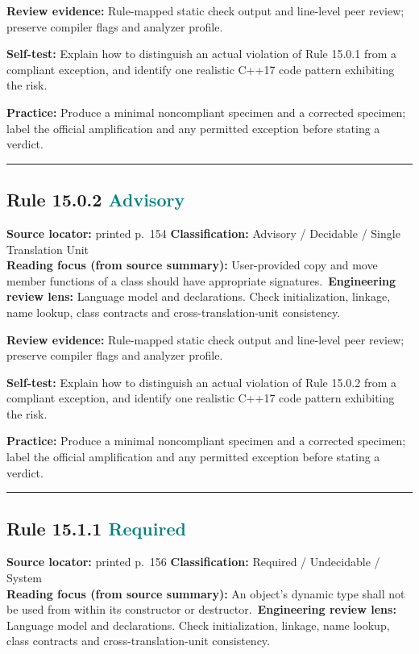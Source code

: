 \documentclass[10pt,letterpaper]{article}
\begin{document}
\textbf{Review evidence:} Rule-mapped static check output and line-level peer review; preserve compiler flags and analyzer profile.

\textbf{Self-test:} Explain how to distinguish an actual violation of Rule 15.0.1 from a compliant exception, and identify one realistic C++17 code pattern exhibiting the risk.\par
\textbf{Practice:} Produce a minimal noncompliant specimen and a corrected specimen; label the official amplification and any permitted exception before stating a verdict.
\smallskip\hrule\smallskip
\subsection*{Rule 15.0.2 \enspace \texorpdfstring{\small\textcolor{teal}{Advisory}}{Advisory}}
\noindent\textbf{Source locator:} printed p.~154 \quad\textbf{Classification:} Advisory / Decidable / Single Translation Unit\\
\textbf{Reading focus (from source summary):} User-provided copy and move member functions of a class should have appropriate signatures.\
\textbf{Engineering review lens:} Language model and declarations. Check initialization, linkage, name lookup, class contracts and cross-translation-unit consistency.

\textbf{Review evidence:} Rule-mapped static check output and line-level peer review; preserve compiler flags and analyzer profile.

\textbf{Self-test:} Explain how to distinguish an actual violation of Rule 15.0.2 from a compliant exception, and identify one realistic C++17 code pattern exhibiting the risk.\par
\textbf{Practice:} Produce a minimal noncompliant specimen and a corrected specimen; label the official amplification and any permitted exception before stating a verdict.
\smallskip\hrule\smallskip
\subsection*{Rule 15.1.1 \enspace \texorpdfstring{\small\textcolor{teal}{Required}}{Required}}
\noindent\textbf{Source locator:} printed p.~156 \quad\textbf{Classification:} Required / Undecidable / System\\
\textbf{Reading focus (from source summary):} An object's dynamic type shall not be used from within its constructor or destructor.\
\textbf{Engineering review lens:} Language model and declarations. Check initialization, linkage, name lookup, class contracts and cross-translation-unit consistency.
\end{document}
